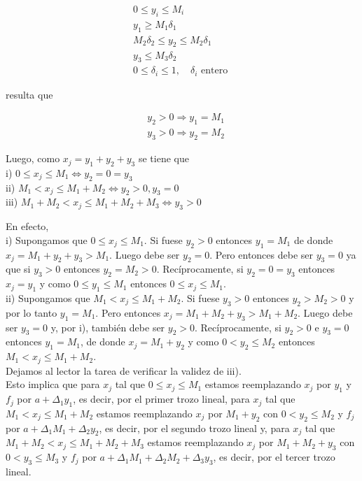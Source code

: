 \documentclass[10pt]{article}
\begin{document}
$$
\begin{gathered}
0 \leq y_{i} \leq M_{i} \\
y_{1} \geq M_{1} \delta_{1} \\
M_{2} \delta_{2} \leq y_{2} \leq M_{2} \delta_{1} \\
y_{3} \leq M_{3} \delta_{2} \\
0 \leq \delta_{i} \leq 1, \quad \delta_{i} \text { entero }
\end{gathered}
$$

resulta que

$$
\begin{aligned}
& y_{2}>0 \Longrightarrow y_{1}=M_{1} \\
& y_{3}>0 \Longrightarrow y_{2}=M_{2}
\end{aligned}
$$

Luego, como $x_{j}=y_{1}+y_{2}+y_{3}$ se tiene que\\
i) $0 \leq x_{j} \leq M_{1} \Longleftrightarrow y_{2}=0=y_{3}$\\
ii) $M_{1}<x_{j} \leq M_{1}+M_{2} \Longleftrightarrow y_{2}>0, y_{3}=0$\\
iii) $M_{1}+M_{2}<x_{j} \leq M_{1}+M_{2}+M_{3} \Longleftrightarrow y_{3}>0$

En efecto,\\
i) Supongamos que $0 \leq x_{j} \leq M_{1}$. Si fuese $y_{2}>0$ entonces $y_{1}=M_{1}$ de donde $x_{j}=M_{1}+y_{2}+y_{3}>M_{1}$. Luego debe ser $y_{2}=0$. Pero entonces debe ser $y_{3}=0$ ya que si $y_{3}>0$ entonces $y_{2}=M_{2}>0$. Recíprocamente, si $y_{2}=0=y_{3}$ entonces $x_{j}=y_{1}$ y como $0 \leq y_{1} \leq M_{1}$ entonces $0 \leq x_{j} \leq M_{1}$.\\
ii) Supongamos que $M_{1}<x_{j} \leq M_{1}+M_{2}$. Si fuese $y_{3}>0$ entonces $y_{2}>M_{2}>0$ y por lo tanto $y_{1}=M_{1}$. Pero entonces $x_{j}=M_{1}+M_{2}+y_{3}>M_{1}+M_{2}$. Luego debe ser $y_{3}=0$ y, por i), también debe ser $y_{2}>0$. Recíprocamente, si $y_{2}>0$ e $y_{3}=0$ entonces $y_{1}=M_{1}$, de donde $x_{j}=M_{1}+y_{2}$ y como $0<y_{2} \leq M_{2}$ entonces $M_{1}<x_{j} \leq M_{1}+M_{2}$.\\
Dejamos al lector la tarea de verificar la validez de iii).\\
Esto implica que para $x_{j}$ tal que $0 \leq x_{j} \leq M_{1}$ estamos reemplazando $x_{j}$ por $y_{1}$ y $f_{j}$ por $a+\Delta_{1} y_{1}$, es decir, por el primer trozo lineal, para $x_{j}$ tal que $M_{1}<x_{j} \leq M_{1}+M_{2}$ estamos reemplazando $x_{j}$ por $M_{1}+y_{2}$ con $0<y_{2} \leq M_{2}$ y $f_{j}$ por $a+\Delta_{1} M_{1}+\Delta_{2} y_{2}$, es decir, por el segundo trozo lineal y, para $x_{j}$ tal que $M_{1}+M_{2}<x_{j} \leq M_{1}+M_{2}+M_{3}$ estamos reemplazando $x_{j}$ por $M_{1}+M_{2}+y_{3}$ con $0<y_{3} \leq M_{3}$ y $f_{j}$ por $a+\Delta_{1} M_{1}+\Delta_{2} M_{2}+\Delta_{3} y_{3}$, es decir, por el tercer trozo lineal.
\end{document}

